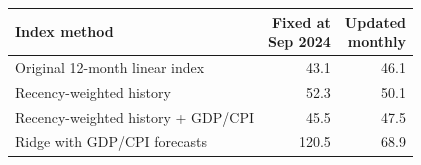 \begin{tabular}{@{}lrr@{}}
\hline
\textbf{Index method} & \shortstack{Fixed at\\Sep 2024} & \shortstack{Updated\\monthly} \\
\hline
Original 12-month linear index & 43.1 & 46.1 \\
Recency-weighted history & 52.3 & 50.1 \\
Recency-weighted history + GDP/CPI & 45.5 & 47.5 \\
Ridge with GDP/CPI forecasts & 120.5 & 68.9 \\
\hline
\end{tabular}
